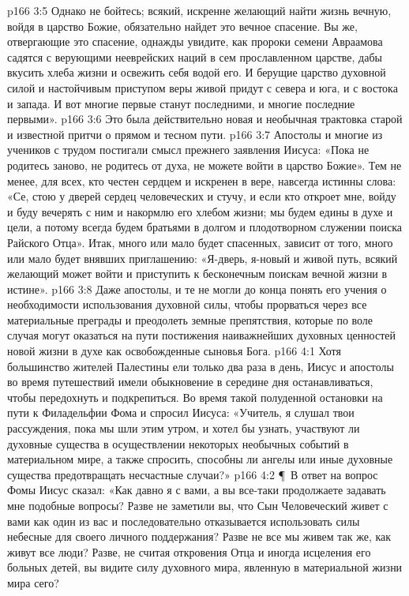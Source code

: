 \vs p166 3:5 Однако не бойтесь; всякий, искренне желающий найти жизнь вечную, войдя в царство Божие, обязательно найдет это вечное спасение. Вы же, отвергающие это спасение, однажды увидите, как пророки семени Авраамова садятся с верующими нееврейских наций в сем прославленном царстве, дабы вкусить хлеба жизни и освежить себя водой его. И берущие царство духовной силой и настойчивым приступом веры живой придут с севера и юга, и с востока и запада. И вот многие первые станут последними, и многие последние первыми».
\vs p166 3:6 Это была действительно новая и необычная трактовка старой и известной притчи о прямом и тесном пути.
\vs p166 3:7 Апостолы и многие из учеников с трудом постигали смысл прежнего заявления Иисуса: «Пока не родитесь заново, не родитесь от духа, не можете войти в царство Божие». Тем не менее, для всех, кто честен сердцем и искренен в вере, навсегда истинны слова: «Се, стою у дверей сердец человеческих и стучу, и если кто откроет мне, войду и буду вечерять с ним и накормлю его хлебом жизни; мы будем едины в духе и цели, а потому всегда будем братьями в долгом и плодотворном служении поиска Райского Отца». Итак, много или мало будет спасенных, зависит от того, много или мало будет внявших приглашению: «Я\hyp{}дверь, я\hyp{}новый и живой путь, всякий желающий может войти и приступить к бесконечным поискам вечной жизни в истине».
\vs p166 3:8 Даже апостолы, и те не могли до конца понять его учения о необходимости использования духовной силы, чтобы прорваться через все материальные преграды и преодолеть земные препятствия, которые по воле случая могут оказаться на пути постижения наиважнейших духовных ценностей новой жизни в духе как освобожденные сыновья Бога.
\vs p166 4:1 Хотя большинство жителей Палестины ели только два раза в день, Иисус и апостолы во время путешествий имели обыкновение в середине дня останавливаться, чтобы передохнуть и подкрепиться. Во время такой полуденной остановки на пути к Филадельфии Фома и спросил Иисуса: «Учитель, я слушал твои рассуждения, пока мы шли этим утром, и хотел бы узнать, участвуют ли духовные существа в осуществлении некоторых необычных событий в материальном мире, а также спросить, способны ли ангелы или иные духовные существа предотвращать несчастные случаи?»
\vs p166 4:2 \P\ В ответ на вопрос Фомы Иисус сказал: «Как давно я с вами, а вы все\hyp{}таки продолжаете задавать мне подобные вопросы? Разве не заметили вы, что Сын Человеческий живет с вами как один из вас и последовательно отказывается использовать силы небесные для своего личного поддержания? Разве не все мы живем так же, как живут все люди? Разве, не считая откровения Отца и иногда исцеления его больных детей, вы видите силу духовного мира, явленную в материальной жизни мира сего?

